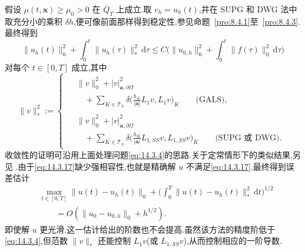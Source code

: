 假设 \(\mu(t,\boldsymbol{x})\ge\mu_0>0\) 在 \(\overline Q_T\) 上成立.取 \(v_h=u_h(t)\),并在 SUPG 和 DWG 法中取充分小的乘积 \(\delta h\),便可像前面那样得到稳定性,参见命题~\ref{pro:8.4.1}至~\ref{pro:8.4.3}.最终得到
\begin{equation}\label{eq:14.3.19}
  \|u_h(t)\|_0^2+\int_0^t\|u_h(\tau)\|_*^2\,\mathrm d\tau
     \le C\biggl(\|u_{0,h}\|_0^2+\int_0^t\|f(\tau)\|_0^2\,\mathrm d\tau\biggr)
\end{equation}
对每个 \(t\in[0,T]\) 成立,其中
\[
  \|v\|_*^2:=
    \begin{cases}
      \begin{aligned}
        &\|v\|_0^2+|v|_{\boldsymbol{a},\partial\Omega}^2\\
        &\quad+\displaystyle\sum_{K\in\mathcal T_h}\delta
             \biggl(\frac{h_K}{|\boldsymbol{a}|}L_1v,L_1v\biggr)_K
          \qquad\text{(GALS)},
      \end{aligned}\\[3pt]
      \begin{aligned}
        &\|v\|_0^2+|v|_{\boldsymbol{a},\partial\Omega}^2\\
        &\quad+\displaystyle\sum_{K\in\mathcal T_h}\delta
             \biggl(\frac{h_K}{|\boldsymbol{a}|}L_{1,SS}v,L_{1,SS}v\biggr)_K
          \qquad\text{(SUPG 或 DWG)}.
      \end{aligned}
    \end{cases}
\]
收敛性的证明可沿用上面处理问题\eqref{eq:14.3.4}的思路.关于定常情形下的类似结果,另见
.由于\eqref{eq:14.3.17}缺少强相容性,也就是精确解 \(u\) 不满足\eqref{eq:14.3.17},最终得到误差估计
\begin{equation}\label{eq:14.3.20}
  \begin{aligned}
    &\max_{t\in[0,T]}\|u(t)-u_h(t)\|_0
         +\biggl(\int_0^T\|u(t)-u_h(t)\|_*^2\,\mathrm dt\biggr)^{1/2}\\
    &\qquad=O(\|u_0-u_{0,h}\|_0+h^{1/2}).
  \end{aligned}
\end{equation}
即使解 \(u\) 更光滑,这一估计给出的阶数也不会提高.虽然该方法的精度阶低于\eqref{eq:14.3.4},但范数 \(\|v\|_*\) 还能控制 \(L_1v\)(或 \(L_{1,SS}v\)),从而控制相应的一阶导数.

